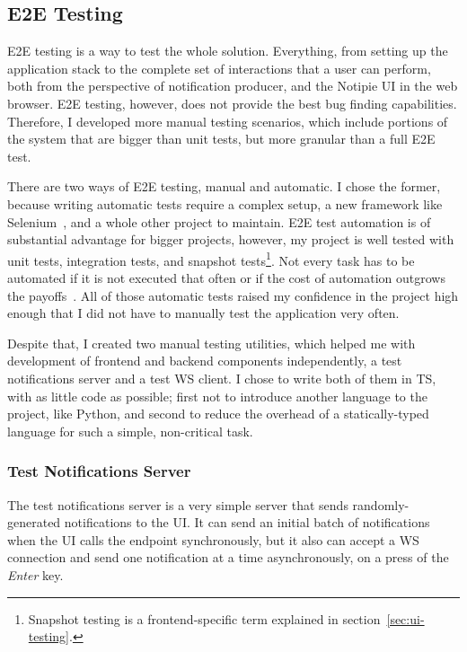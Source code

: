 \subsection{E2E Testing}\label{sec:e2e-testing}

\ac{E2E} testing is a way to test the whole solution.
Everything,
from setting up the application stack
to the complete set of interactions
that a user can perform,
both from the perspective of notification producer,
and the Notipie \ac{UI} in the web browser.
\ac{E2E} testing, however, does not provide
the best bug finding capabilities.
Therefore,
I developed more manual testing scenarios,
which include portions of the system
that are bigger than unit tests,
but more granular than a full \ac{E2E} test.

There are two ways of \ac{E2E} testing,
manual and automatic.
I chose the former,
because writing automatic tests
require a complex setup,
a new framework like Selenium~\cite{steward_selenium_2022},
and a whole other project to maintain.
\ac{E2E} test automation is of substantial advantage
for bigger projects, however,
my project is well tested with
unit tests,
integration tests, and
snapshot tests\footnote{
  Snapshot testing is a frontend-specific term
  explained in section~\ref{sec:ui-testing}.
}.
Not every task has to be automated
if it is not executed that often
or if the cost of automation outgrows
the payoffs~\cite{millett_patterns_2015}.
All of those automatic tests
raised my confidence in the project high enough
that I did not have to manually test
the application very often.

Despite that,
I created two manual testing utilities,
which helped me with development
of frontend and backend components independently,
a test notifications server
and a test \ac{WS} client.
I chose to write both of them in \ac{TS},
with as little code as possible;
first not to introduce another language
to the project, like Python,
and second to reduce the overhead
of a statically-typed language
for such a simple, non-critical task.

\subsubsection{Test Notifications Server}\label{sec:test-notifications-server}

The test notifications server
is a very simple server that sends
randomly-gene\-rated notifications to the \ac{UI}.
It can send an initial batch of notifications
when the \ac{UI} calls the endpoint synchronously,
but it also can accept a \ac{WS} connection
and send one notification at a time asynchronously,
on a press of the \textit{Enter} key.

